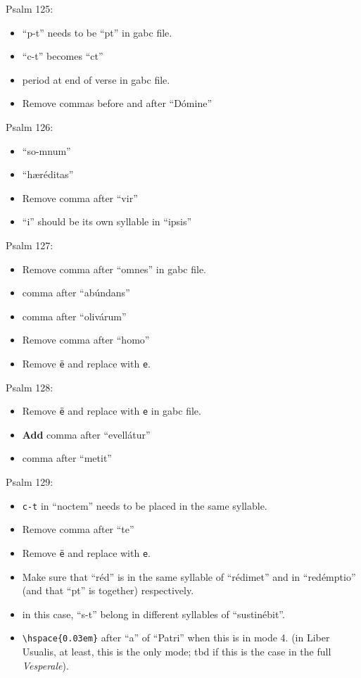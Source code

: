 \documentclass[11pt]{article}
\begin{document}
               Psalm 125:
  \begin{itemize}
   \item
 ``p-t'' needs to be ``pt'' in gabc file.
     \item
    ``c-t'' becomes ``ct'' 
    \item
    period at end of
    verse in gabc file.
  \item Remove commas before and after ``Dómine''
    \end{itemize}
      
         Psalm 126:
  \begin{itemize}
  \item ``so-mnum''
  \item
  ``hæréditas''
  \item  Remove comma after ``vir''
    \item ``i'' should be its own syllable in ``ipsis''
  
    \end{itemize}
 
   Psalm 127:
  \begin{itemize}
  \item Remove comma after ``omnes'' in gabc file.
  \item
  comma after ``abúndans''
   \item
  comma after ``olivárum''
    \item Remove comma after ``homo''
 \item Remove \texttt{ë} and replace with \texttt{e}.
 
  \end{itemize}
  
  Psalm 128:
  \begin{itemize}
  \item Remove \texttt{ë} and replace with \texttt{e} in gabc file.
  \item \textbf{Add} comma after ``evellátur''
    \item
  comma after ``metit''
    \end{itemize}
 
  Psalm 129:
  \begin{itemize}
  \item  \texttt{c-t} in ``noctem'' needs to be placed in the same syllable.
    \item Remove comma after ``te''
  \item Remove \texttt{ë} and replace with \texttt{e}.
    \item Make sure that ``réd'' is in the same syllable of ``rédimet'' and in ``redémptio'' (and that ``pt'' is together) respectively.
   \item in this case, ``s-t'' belong in different syllables of ``sustinébit''.
    \item \verb|\hspace{0.03em}| after ``a'' of ``Patri'' when this is in mode 4. (in Liber Usualis, at least, this is the only mode; tbd if this is the case in the full \textit{Vesperale}).
 
  \end{itemize}
  
\end{document}
